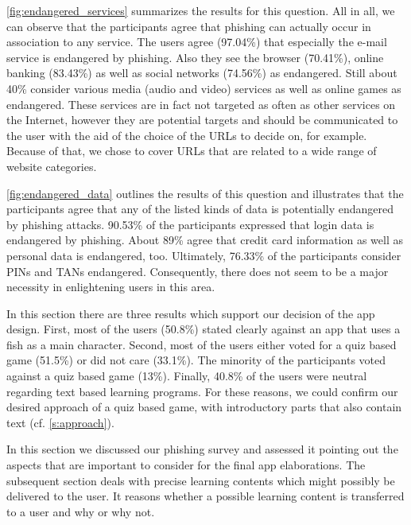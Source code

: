 \begin{description}[leftmargin=0cm]
	\item[Services Endangered by Phishing:] \autoref{fig:endangered_services} summarizes the results for this question.
 All in all, we can observe that the participants agree that phishing can actually occur in association to any service.
 The users agree (97.04\%) that especially the e-mail service is endangered by phishing.
 Also they see the browser (70.41\%), online banking (83.43\%) as well as social networks (74.56\%) as endangered.
 Still about 40\% consider various media (audio and video) services as well as online games as endangered.
 These services are in fact not targeted as often as other services on the Internet, however they are potential targets and should be communicated to the user with the aid of the choice of the URLs to decide on, for example.
Because of that, we chose to cover URLs that are related to a wide range of website categories.

	\item[Data Endangered by Phishing:] \autoref{fig:endangered_data} outlines the results of this question and illustrates that the participants agree that any of the listed kinds of data is potentially endangered by phishing attacks.
 90.53\% of the participants expressed that login data is endangered by phishing.
 About 89\% agree that credit card information as well as personal data is endangered, too.
 Ultimately, 76.33\% of the participants consider PINs and TANs endangered.
 Consequently, there does not seem to be a major necessity in enlightening users in this area.

	\item[Preferences for an Education App:] In this section there are three results which support our decision of the app design. 
	First, most of the users (50.8\%) stated clearly against an app that uses a fish as a main character. 
	Second, most of the users either voted for a quiz based game (51.5\%) or did not care (33.1\%).
	The minority of the participants voted against a quiz based game (13\%).
	Finally, 40.8\% of the users were neutral regarding text based learning programs.
	For these reasons, we could confirm our desired approach of a quiz based game, with introductory parts that also contain text (cf. \autoref{s:approach}).
\end{description}
In this section we discussed our phishing survey and assessed it pointing out the aspects that are important to consider for the final app elaborations.
The subsequent section deals with precise learning contents which might possibly be delivered to the user.
It reasons whether a possible learning content is transferred to a user and why or why not.

